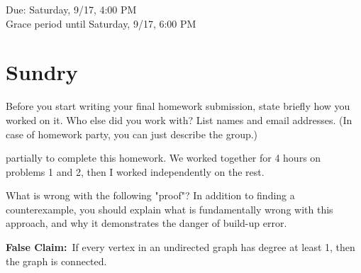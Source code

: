 \documentclass[11pt]{article}
\begin{document}
\maketitle
\fontsize{12}{15}\selectfont

\begin{center}
    Due: Saturday, 9/17, 4:00 PM \\
    Grace period until Saturday, 9/17, 6:00 PM \\
\end{center}

\section*{Sundry}
Before you start writing your final homework submission, state briefly how you worked on it.  Who else did you work with?  List names and email addresses.  (In case of homework party, you can just describe the group.)

{ partially to complete this homework. We worked together for 4 hours on problems 1 and 2, then I worked independently on the rest.
}

\vspace{15pt}


What is wrong with the following "proof"? In addition to finding a counterexample, you should explain what is fundamentally wrong with this approach, and why it demonstrates the danger of build-up error.

\textbf{False Claim:}~If every vertex in an undirected graph has degree at least 1, then the graph is connected.
\end{document}
